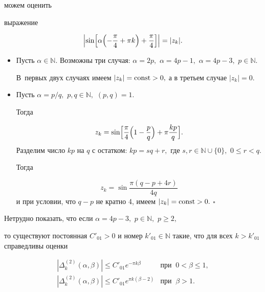 можем оценить

выражение 

$$

\Bigl|\sin\Bigl[\alpha\Bigl(-\frac{\pi}{4}+\pi k\Bigr)+\frac{\pi}{4}\Bigr]\Bigr|=|z_k|.

$$



\begin{itemize}

\item[1)] Пусть $\alpha\in \mathbb{N}.$ Возможны  три случая: $\alpha=2p,$ $\alpha=4p-1,$ $\alpha=4p-3,$ $p\in \mathbb{N}.$ 

В~первых двух случаях имеем $|z_k|={\rm const}> 0,$  а в третьем случае $|z_k|=0.$



\item[2)] Пусть $\alpha=p/q,$ $p, q\in \mathbb{N},$ $(p, q)=1.$  

Тогда 

$$z_k= \sin\Bigl[\frac{\pi}{4}\Bigl(1-\frac pq\Bigr)+\pi \frac{kp}{q}\Bigr].$$ Разделим число $kp$ на $q$ с остатком: $kp=sq+r,$ где $s, r\in \mathbb{N}\cup\{0\},$ $0\le r<q.$

Тогда

$$ z_k=\sin\frac{\pi(q-p+4r)}{4q}$$ и при условии, что $q-p$ не кратно 4, имеем $|z_k|={\rm const}> 0.$ $\square$

\end{itemize}





\smallskip



Нетрудно показать, что если $\alpha=4p-3,$ $p\in \mathbb{N},$ $p\ge 2,$ 

то существуют  постоянная $C'_{01}>0$ и номер $k'_{01}\in \mathbb{N}$ такие, что для всех $k>k'_{01}$  справедливы оценки

$$

\begin{array}{ll}

|\Delta_{k}^{(2)}(\alpha,\beta)|\le C'_{01} e^{-\pi k\beta} & \text{при}\;\; 0<\beta\le 1,\\

|\Delta_{k}^{(2)}(\alpha,\beta)|\le C'_{01} e^{\pi k(\beta-2)} & \text{при}\;\;\beta>1.

\end{array}

$$









